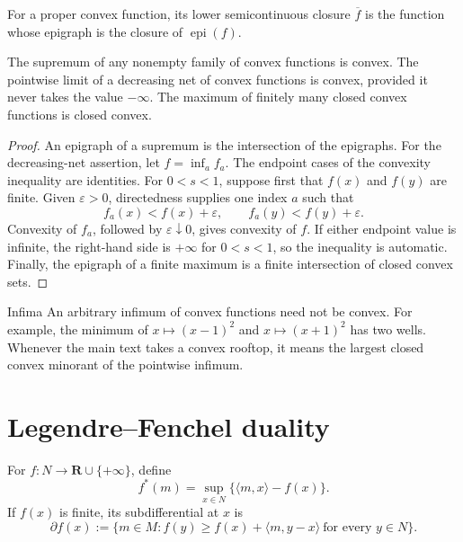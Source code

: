 For a proper convex function, its lower semicontinuous closure
\(\overline f\) is the function whose epigraph is the closure of
\(\operatorname{epi}(f)\).

\begin{lemma}\label{lem:appD-closure-rules}
The supremum of any nonempty family of convex functions is convex.
The pointwise limit of a decreasing net of convex functions is convex,
provided it never takes the value \(-\infty\).
The maximum of finitely many closed convex functions is closed convex.
\end{lemma}

\begin{proof}
An epigraph of a supremum is the intersection of the epigraphs.
For the decreasing-net assertion, let \(f=\inf_a f_a\).
The endpoint cases of the convexity inequality are identities.
For \(0<s<1\), suppose first that \(f(x)\) and \(f(y)\) are finite.
Given \(\varepsilon>0\), directedness supplies
one index \(a\) such that
\[
 f_a(x)<f(x)+\varepsilon,\qquad
 f_a(y)<f(y)+\varepsilon.
\]
Convexity of \(f_a\), followed by \(\varepsilon\downarrow0\), gives convexity
of \(f\).  If either endpoint value is infinite, the right-hand side is
\(+\infty\) for \(0<s<1\), so the inequality is automatic.
Finally, the epigraph of a finite maximum is a finite intersection of closed
convex sets.
\end{proof}

\begin{warning}{Infima}
\label{warn:appD-arbitrary-infima}
An arbitrary infimum of convex functions need not be convex.
For example, the minimum of
\(x\mapsto(x-1)^2\) and \(x\mapsto(x+1)^2\) has two wells.
Whenever the main text takes a convex rooftop, it means the largest closed
convex minorant of the pointwise infimum.
\end{warning}

\section{Legendre--Fenchel duality}
\label{sec:appD-legendre}

\begin{definition}
\label{def:appD-conjugate}
For \(f:N\to\mathbf R\cup\{+\infty\}\), define
\[
 f^*(m)=\sup_{x\in N}\{\langle m,x\rangle-f(x)\}.
\tag{D.2}\label{eq:appD-conjugate}
\]
If \(f(x)\) is finite, its subdifferential at \(x\) is
\[
 \partial f(x)
 :=\{m\in M:
 f(y)\geq f(x)+\langle m,y-x\rangle\ \text{for every }y\in N\}.
\tag{D.3}\label{eq:appD-subgradient}
\]
\end{definition}

